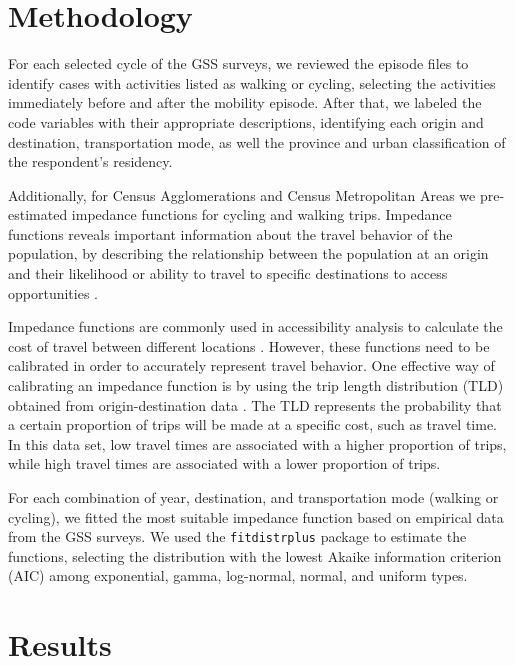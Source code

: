 \documentclass[Royal,times,sageh]{sagej}
\begin{document}
\section{Methodology}\label{methodology}

For each selected cycle of the GSS surveys, we reviewed the episode
files to identify cases with activities listed as walking or cycling,
selecting the activities immediately before and after the mobility
episode. After that, we labeled the code variables with their
appropriate descriptions, identifying each origin and destination,
transportation mode, as well the province and urban classification of
the respondent's residency.

Additionally, for Census Agglomerations and Census Metropolitan Areas we
pre-estimated impedance functions for cycling and walking trips.
Impedance functions reveals important information about the travel
behavior of the population, by describing the relationship between the
population at an origin and their likelihood or ability to travel to
specific destinations to access opportunities \citep{soukhov2024}.

Impedance functions are commonly used in accessibility analysis to
calculate the cost of travel between different locations
\citep{hansen1959, páez2012, palacios2022}. However, these functions
need to be calibrated in order to accurately represent travel behavior.
One effective way of calibrating an impedance function is by using the
trip length distribution (TLD) obtained from origin-destination data
\citep{soukhov2024}. The TLD represents the probability that a certain
proportion of trips will be made at a specific cost, such as travel
time. In this data set, low travel times are associated with a higher
proportion of trips, while high travel times are associated with a lower
proportion of trips.

For each combination of year, destination, and transportation mode
(walking or cycling), we fitted the most suitable impedance function
based on empirical data from the GSS surveys. We used the
\texttt{fitdistrplus} package \citep{mullerdutang2015} to estimate the
functions, selecting the distribution with the lowest Akaike information
criterion (AIC) among exponential, gamma, log-normal, normal, and
uniform types.

\section{Results}\label{results}
\end{document}
